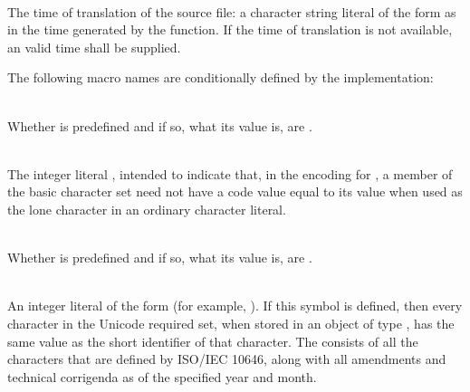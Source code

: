 \begin{description}
%
\item {}\\
The time of translation of the source file:
a character string literal of the form
as in the time generated by the
function.
If the time of translation is not available,
an  valid time shall be supplied.
\end{description}

\pnum
The following macro names are conditionally defined by the implementation:

\begin{description}
%
%
\item {}\\
Whether  is predefined and if so, what its value is,
are .

%
%
\item {}\\
The integer literal , intended to indicate that, in the encoding for
, a member of the basic character set need not have a code value equal to
its value when used as the lone character in an ordinary character literal.

%
%
\item {}\\
Whether  is predefined and if so, what its value is,
are .

%
%
\item {}\\
An integer literal of the form  (for example,
).
If this symbol is defined, then every character in the Unicode required set, when
stored in an object of type , has the same value as the short identifier
of that character. The  consists of all
the characters that are defined by ISO/IEC 10646, along with
all amendments and technical corrigenda as of the specified year and month.


\end{description}
